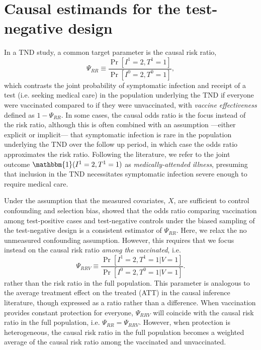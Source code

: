 \documentclass[11pt]{article}
\begin{document}
\section{Causal estimands for the test-negative design} \label{sec:estimands}
In a TND study, a common target parameter is the causal risk ratio,
\begin{equation*}
    \Psi_{RR} \equiv \dfrac{\Pr[I^1 = 2, T^1 = 1]}{\Pr[I^0 = 2, T^0 = 1]},
\end{equation*}
which contrasts the joint probability of symptomatic infection and receipt of a test (i.e. seeking medical care) in the population underlying the TND if everyone were vaccinated compared to if they were unvaccinated, with \textit{vaccine effectiveness} defined as $1 - \Psi_{RR}$. In some cases, the causal odds ratio is the focus instead of the risk ratio, although this is often combined with an assumption ---either explicit or implicit--- that symptomatic infection is rare in the population underlying the TND over the follow up period, in which case the odds ratio approximates the risk ratio. Following the literature, we refer to the joint outcome $\mathbbm{1}(I^1 = 2, T^1 = 1)$ as \textit{medically-attended illness}, presuming that inclusion in the TND necessitates symptomatic infection severe enough to require medical care. 

Under the assumption that the measured covariates, $X$, are sufficient to control confounding and selection bias,  \cite{schnitzer_estimands_2022} showed that the odds ratio comparing vaccination among test-positive cases and test-negative controls under the biased sampling of the test-negative design is a consistent estimator of $\Psi_{RR}$. Here, we relax the no unmeasured confounding assumption. However, this requires that we focus instead on the causal risk ratio \textit{among the vaccinated}, i.e.
\begin{equation*}
    \Psi_{RRV} \equiv \dfrac{\Pr[I^1 = 2, T^1 =1 | V = 1]}{\Pr[I^0 = 2, T^0 =1 | V = 1]} .
\end{equation*}
rather than the risk ratio in the full population. This parameter is analogous to the average treatment effect on the treated (ATT) in the causal inference literature, though expressed as a ratio rather than a difference. When vaccination provides constant protection for everyone, $\Psi_{RRV}$ will coincide with the causal risk ratio in the full population, i.e. $\Psi_{RR} = \Psi_{RRV}$. However, when protection is heterogeneous, the causal risk ratio in the full population becomes a weighted average of the causal risk ratio among the vaccinated and unvaccinated.
\end{document}
